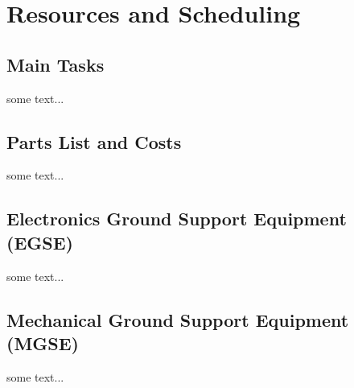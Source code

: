 \section{Resources and Scheduling}
\label{sec:resources_scheduling}

\subsection{Main Tasks}
some text...

\subsection{Parts List and Costs}
some text...

\subsection{Electronics Ground Support Equipment (EGSE)}
some text...

\subsection{Mechanical Ground Support Equipment (MGSE)}
some text...